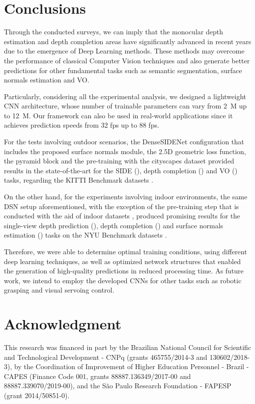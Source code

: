 \documentclass[5p]{elsarticle}
\begin{document}
\section{Conclusions}

Through the conducted surveys, we can imply that the monocular depth estimation and depth completion areas have significantly advanced in recent years due to the emergence of Deep Learning methods. These methods may overcome the performance of classical Computer Vision techniques and also generate better predictions for other fundamental tasks such as semantic segmentation, surface normals estimation and VO.

Particularly, considering all the experimental analysis, we designed a lightweight CNN architecture, whose number of trainable parameters can vary from 2\ M up to 12\ M. Our framework can also be used in real-world applications since it achieves prediction speeds from 32 fps up to 88 fps.

For the tests involving outdoor scenarios, the DenseSIDENet configuration that includes the proposed surface normals module, the 2.5D geometric loss function, the pyramid block and the pre-training with the cityscapes \cite{cordts2016cityscapes} dataset provided results in the state-of-the-art for the SIDE (), depth completion () and VO () tasks, regarding the KITTI Benchmark datasets \cite{uhrig2017sparsity,Geiger2012CVPR,Alhaija2018IJCV}.

On the other hand, for the experiments involving indoor environments, the same DSN setup aforementioned, with the exception of the pre-training step that is conducted with the aid of indoor datasets \cite{song2015sun,janoch2013category,xiao2013sun3d}, produced promising results for the single-view depth prediction (), depth completion () and surface normals estimation () tasks on the NYU Benchmark datasets \cite{silberman2012indoor}.

Therefore, we were able to determine optimal training conditions, using different deep learning techniques, as well as optimized network structures that enabled the generation of high-quality predictions in reduced processing time. As future work, we intend to employ the developed CNNs for other tasks such as robotic grasping and visual servoing control.


\section*{Acknowledgment}

This research was financed in part by the Brazilian National Council for Scientific and Technological Development - CNPq (grants 465755/2014-3 and 130602/2018-3), by the Coordination of Improvement of Higher Education Personnel - Brazil - CAPES (Finance Code 001, grants 88887.136349/2017-00 and 88887.339070/2019-00), and the S\~{a}o Paulo Research Foundation - FAPESP (grant {2014/50851-0}).
\end{document}

